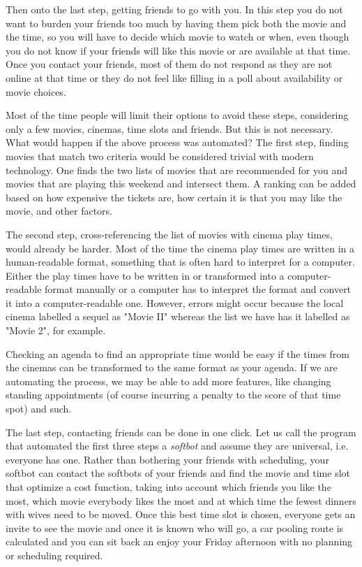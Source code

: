 \documentclass{article}
\begin{document}
 Then onto the last step, getting friends to go with you. In this step you do not want to burden your friends too much by having them pick both the movie and the time, so you will have to decide which movie to watch or when, even though you do not know if your friends will like this movie or are available at that time. Once you contact your friends, most of them do not respond as they are not online at that time or they do not feel like filling in a poll about availability or movie choices.
 
 Most of the time people will limit their options to avoid these steps, considering only a few movies, cinemas, time slots and friends. But this is not necessary. What would happen if the above process was automated? The first step, finding movies that match two criteria would be considered trivial with modern technology. One finds the two lists of movies that are recommended for you and movies that are playing this weekend and intersect them. A ranking can be added based on how expensive the tickets are, how certain it is that you may like the movie, and other factors.
 
 The second step, cross-referencing the list of movies with cinema play times, would already be harder. Most of the time the cinema play times are written in a human-readable format, something that is often hard to interpret for a computer. Either the play times have to be written in or transformed into a computer-readable format manually or a computer has to interpret the format and convert it into a computer-readable one. However, errors might occur because the local cinema labelled a sequel as "Movie II" whereas the list we have has it labelled as "Movie 2", for example.
 
 Checking an agenda to find an appropriate time would be easy if the times from the cinemas can be transformed to the same format as your agenda. If we are automating the process, we may be able to add more features, like changing standing appointments (of course incurring a penalty to the score of that time spot) and such.
 
 The last step, contacting friends can be done in one click. Let us call the program that automated the first three steps a \emph{softbot} and assume they are universal, i.e. everyone has one. Rather than bothering your friends with scheduling, your softbot can contact the softbots of your friends and find the movie and time slot that optimize a cost function, taking into account which friends you like the most, which movie everybody likes the most and at which time the fewest dinners with wives need to be moved. Once this best time slot is chosen, everyone gets an invite to see the movie and once it is known who will go, a car pooling route is calculated and you can sit back an enjoy your Friday afternoon with no planning or scheduling required.
 
\end{document}
